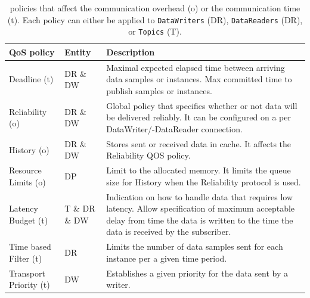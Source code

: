 \begin{table}[h!]
	\begin{center}
		\caption{ policies that affect the communication overhead (o) or the communication time (t). Each  policy can either be applied to \texttt{DataWriters} (DR), \texttt{DataReaders} (DR), or \texttt{Topics} (T).}
		\label{tab:qos_garciavalls}
		\begin{tabularx}{\textwidth}{|l|l|X|}
			\hline
			\textbf{QoS policy} & \textbf{Entity} & \textbf{Description}\\
			\hline \hline
			Deadline (t) & DR \& DW & Maximal expected elapsed time between arriving data samples or instances. Max committed time to publish samples or instances.\\
			\hline
			Reliability (o) & DR \& DW & Global policy that specifies whether or not data will be delivered reliably. It can be configured on a per DataWriter/-DataReader connection. \\
			\hline
			History (o) & DR \& DW & Stores sent or received data in cache. It affects the Reliability \gls*{QOS} policy. \\
			\hline
			Resource Limits (o) & DP & Limit to the allocated memory. It limits the queue size for History when the Reliability protocol is used. \\
			\hline
			Latency Budget (t) & T \& DR \& DW & Indication on how to handle data that requires low latency. Allow specification of maximum acceptable delay from time the data is written to the time the data is received by the subscriber. \\
			\hline
			Time based Filter (t) & DR & Limits the number of data samples sent for each instance per a given time period. \\
			\hline
			Transport Priority (t) & DW & Establishes a given priority for the data sent by a writer.\\
			\hline
		\end{tabularx}
	\end{center}
\end{table}

